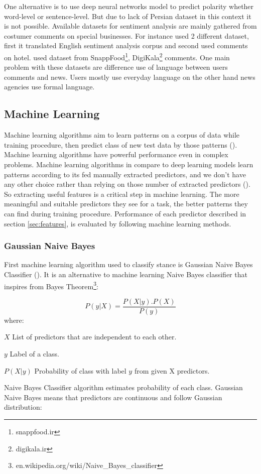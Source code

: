 \bigbreak
One alternative is to use deep neural networks model to predict polarity whether word-level or sentence-level. But due to lack of Persian dataset in this context it is not possible. Available datasets for sentiment analysis are mainly gathered from costumer comments on special businesses. For instance \cite{polar_hotel} used 2 different dataset, first it translated English sentiment analysis corpus and second used comments on hotel. \cite{polar_servic} used dataset from SnappFood\footnote{snappfood.ir}, DigiKala\footnote{digikala.ir} comments. One main problem with these datasets are difference use of language between users comments and news. Users mostly use everyday language on the other hand news agencies use formal language.
\subsection{Machine Learning}
Machine learning algorithms aim to learn patterns on a corpus of data while training procedure, then predict class of new test data by those patterns (\cite{book_fake}). Machine learning algorithms have powerful performance even in complex problems. Machine learning algorithms in compare to deep learning models learn patterns according to its fed manually extracted predictors, and we don't have any other choice rather than relying on those number of extracted predictors (\cite{book_fake}). So extracting useful features  is a critical step in machine learning. The more meaningful and suitable predictors they see for a task, the better patterns they can find during training procedure. Performance of each predictor described in section \ref{sec:features}, is evaluated by following machine learning methods.   

\subsubsection{Gaussian Naive Bayes}
First machine learning algorithm used to classify stance is Gaussian Naive Bayes Classifier (\cite{GNbayes}). It is an alternative to machine learning Naive Bayes classifier that inspires from Bayes Theorem\footnote{en.wikipedia.org/wiki/Naive\_Bayes\_classifier}:

\[ P\left(y | X\right) =   \frac{P(X|y).P(X)}{P(y)} \]
where:
\begin{eqexpl}[25mm]
	\item{$X$} List of predictors that are independent to each other.
	\item{$y$} Label of a class.
	\item{$P\left(X|y\right)$} Probability of class with label $y$ from given X predictors.
\end{eqexpl}
 Naive Bayes Classifier algorithm estimates probability of each class. Gaussian Naive Bayes means that predictors are continuous and follow Gaussian distribution:
 
